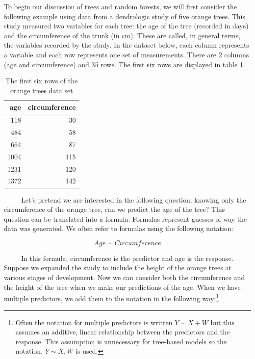 \documentclass[12pt,twoside]{reedthesis}
\begin{document}
  To begin our discussion of trees and random forests, we will first
  consider the following example using data from a dendrologic study of
  five orange trees. This study measured two variables for each tree: the
  age of the tree (recorded in days) and the circumference of the trunk
  (in cm). These are called, in general terms, the variables recorded by
  the study. In the dataset below, each column represents a variable and
  each row represents one set of measurements. There are 2 columns (age
  and circumference) and 35 rows. The first six rows are displayed in
  table \ref{tab:taborange}.
  
  \begin{table}
  
  \caption{\label{tab:unnamed-chunk-2}\label{tab:taborange}The first six rows of the orange trees data set}
  \centering
  \begin{tabular}[t]{r|r}
  \hline
  age & circumference\\
  \hline
  118 & 30\\
  \hline
  484 & 58\\
  \hline
  664 & 87\\
  \hline
  1004 & 115\\
  \hline
  1231 & 120\\
  \hline
  1372 & 142\\
  \hline
  \end{tabular}
  \end{table}
  
  ~~~~~Let's pretend we are interested in the following question: knowing
  only the circumference of the orange tree, can we predict the age of the
  tree? This question can be translated into a formula. Formulas represent
  guesses of way the data was generated. We often refer to formulas using
  the following notation:
  
  \[Age \sim Circumference \]
  
  ~~~~~In this formula, circumference is the predictor and age is the
  response. Suppose we expanded the study to include the height of the
  orange trees at various stages of development. Now we can consider both
  the circumference and the height of the tree when we make our
  predictions of the age. When we have multiple predictors, we add them to
  the notation in the following way:\footnote{Often the notation for
    multiple predictors is written \(Y \sim X+W\) but this assumes an
    additive, linear relationship between the predictors and the response.
    This assumption is unnecessary for tree-based models so the notation,
    \(Y\sim X,W\) is used.}
  
\end{document}
